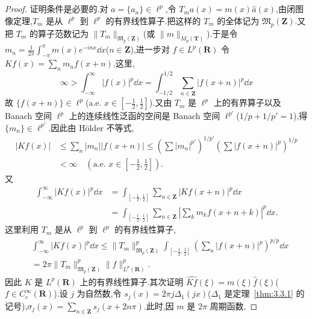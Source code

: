 \begin{proof}
证明条件是必要的.对 $a = \{a_{n}\} \in \ell^{p}$,令 $\widehat{T_{m}}a(x) = m(x)\widehat{a}(x)$,由闭图像定理,$T_{m}$ 是从 $\ell^{p}$ 到 $\ell^{p}$ 的有界线性算子.把这样的 $T_{m}$ 的全体记为 $\mathfrak{M}_{p}(\mathbf{Z})$.又把 $T_{m}$ 的算子范数记为 $\|T_{m}\|_{\mathfrak{M}_{p}(\mathbf{Z})}$(或 $\|m\|_{M_{p}(\mathbf{T})}$).于是令 $m_{n} = \frac{1}{2\pi}\int_{-\pi}^{\pi}m(x)e^{-inx}\dd x$($n \in \mathbf{Z}$),进一步对 $f \in L^{p}(\mathbf{R})$ 令 $Kf(x) = \sum_{n}m_{n}f(x + n)$.这里,
\begin{equation*}
\infty > \int_{-\infty}^{\infty}|f(x)|^{p}\dd x = \int_{-1/2}^{1/2}\sum_{n \in \mathbf{Z}}|f(x + n)|^{p}\dd x
\end{equation*}
故 $\{f(x + n)\} \in \ell^{p}$(a.e. $x \in [-\frac{1}{2}, \frac{1}{2}]$).又由 $T_{m}$ 是 $\ell^{p}$ 上的有界算子以及 Banach 空间 $\ell^{p}$ 上的连续线性泛函的空间是 Banach 空间 $\ell^{p'}$($1/p + 1/p' = 1$),得 $\{m_{n}\} \in \ell^{p'}$.因此由 Hölder 不等式,
\begin{align*}
|Kf(x)| &\leq \sum_{n}|m_{n}||f(x + n)| \leq \left(\sum|m_{n}|^{p'}\right)^{1/p'}\left(\sum|f(x + n)|^{p}\right)^{1/p}\\
&< \infty \quad \left(\text{a.e. } x \in \left[-\frac{1}{2}, \frac{1}{2}\right]\right).
\end{align*}
又
\begin{equation*}
\begin{aligned}
\int_{-\infty}^{\infty}|Kf(x)|^{p}\dd x &= \int_{[-\frac{1}{2}, \frac{1}{2}]}\sum_{n \in \mathbf{Z}}|Kf(x + n)|^{p}\dd x\\
&= \int_{[-\frac{1}{2}, \frac{1}{2}]}\sum_{n \in \mathbf{Z}}\left|\sum_{k}m_{k}f(x + n + k)\right|^{p}\dd x.
\end{aligned}
\end{equation*}
这里利用 $T_{m}$ 是从 $\ell^{p}$ 到 $\ell^{p}$ 的有界线性算子,
\begin{align*}
&\int_{-\infty}^{\infty}|Kf(x)|^{p}\dd x \leq \|T_{m}\|_{\mathfrak{M}_{p}(\mathbf{Z})}^{p}\int_{[-\frac{1}{2}, \frac{1}{2}]}\left(\sum_{n}|f(x + n)|^{p}\right)^{p/p}\dd x\\
&= 2\pi\|T_{m}\|_{\mathfrak{M}_{p}(\mathbf{Z})}^{p}\|f\|_{L^{p}(\mathbf{R})}^{p}.
\end{align*}
因此 $K$ 是 $L^{p}(\mathbf{R})$ 上的有界线性算子.其次证明 $\widehat{Kf}(\xi) = m(\xi)\widehat{f}(\xi)$($f \in C_{c}^{\infty}(\mathbf{R})$).设 $j$ 为自然数,令 $s_{j}(x) = 2\pi j\Delta_{1}(jx)$($\Delta_{1}$ 是定理~\ref{thm:3.3.1} 的记号),$\sigma_{j}(x) = \sum_{n \in \mathbf{Z}}s_{j}(x + 2n\pi)$.此时,因 $m$ 是 $2\pi$ 周期函数,

\end{proof}
